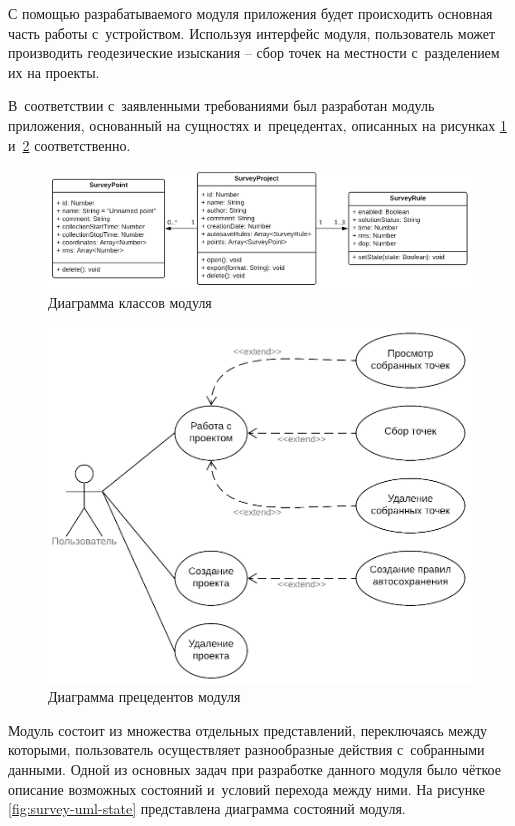 \documentclass[pta]{../../../../scs-iam}
\begin{document}
С помощью разрабатываемого модуля приложения будет происходить основная часть работы с~устройством. Используя интерфейс модуля, пользователь может производить геодезические изыскания -- сбор точек на местности с~разделением их на проекты.

В~соответствии с~заявленными требованиями был разработан модуль приложения, основанный на сущностях и~прецедентах, описанных на рисунках \ref{fig:survey-uml-classes} и~\ref{fig:survey-uml-usecase} соответственно.

\begin{figure}[h!]
  \centering
  \setlength{\fboxsep}{5pt}
  \includegraphics[width=\textwidth]{../../../../img/uml/survey_class}
  \caption{Диаграмма классов модуля}
  \label{fig:survey-uml-classes}
\end{figure}

\begin{figure}[h!]
  \centering
  \setlength{\fboxsep}{5pt}
  \includegraphics[width=.8\textwidth]{../../../../img/uml/survey_usecase}
  \vspace*{6pt}
  \caption{Диаграмма прецедентов модуля}
  \label{fig:survey-uml-usecase}
\end{figure}

Модуль состоит из множества отдельных представлений, переключаясь между которыми, пользователь осуществляет разнообразные действия с~собранными данными. Одной из основных задач при разработке данного модуля было чёткое описание возможных состояний и~условий перехода между ними. На рисунке \ref{fig:survey-uml-state} представлена диаграмма состояний модуля.
\end{document}
